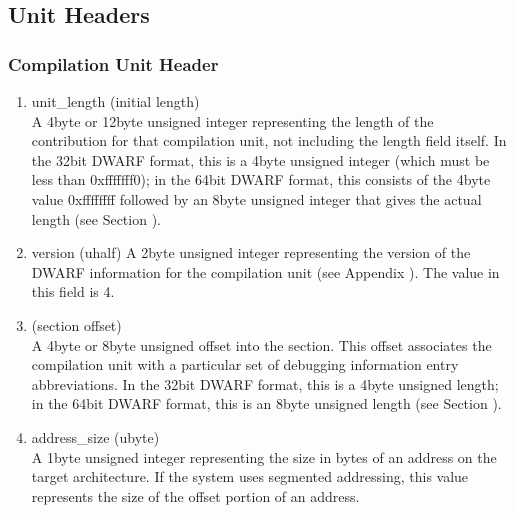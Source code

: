 \subsection{Unit Headers}
\label{datarep:unitheaders}

\subsubsection{Compilation Unit Header}
\label{datarep:compilationunitheader}

\begin{enumerate}[1.]

\item unit\_length (initial length) \\
A 4\dash byte or 12\dash byte unsigned integer representing the length
of the 
contribution for that compilation unit,
not including the length field itself. In the 32\dash bit DWARF
format, this is a 4\dash byte unsigned integer (which must be less
than 0xfffffff0); in the 64\dash bit DWARF format, this consists
of the 4\dash byte value 0xffffffff followed by an 8\dash byte unsigned
integer that gives the actual length 
(see Section ).

\item  version (uhalf)
A 2\dash byte unsigned integer representing the version of the
DWARF information for the compilation unit 
(see Appendix ). 
The value in this field is 4.

\item {} (section offset) \\
A 4\dash byte or 8\dash byte unsigned offset into the 
section. This offset associates the compilation unit with a
particular set of debugging information entry abbreviations. In
the 32\dash bit DWARF format, this is a 4\dash byte unsigned length;
in the 64\dash bit DWARF format, this is an 8\dash byte unsigned length
(see Section ).

\item address\_size (ubyte) \\
A 1\dash byte unsigned integer representing the size in bytes of
an address on the target architecture. If the system uses
segmented addressing, this value represents the size of the
offset portion of an address.




\end{enumerate}

